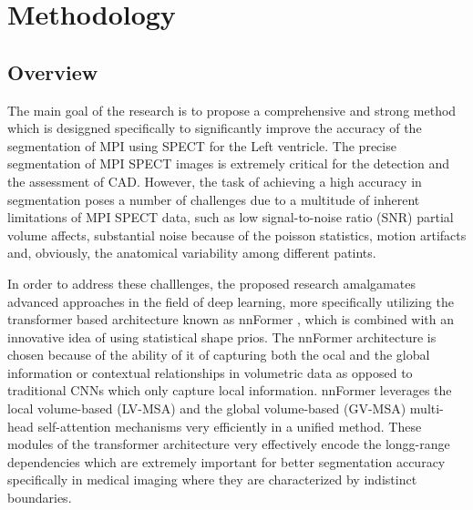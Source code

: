 \chapter{Methodology}
\label{ch:method}

% 		

\section{Overview}
The main goal of the research is to propose a comprehensive and strong method which is desiggned specifically to significantly improve the accuracy of the segmentation of MPI using SPECT for the Left ventricle. The precise segmentation of MPI SPECT images is extremely critical for the detection and the assessment of CAD. However, the task of achieving a high accuracy in segmentation poses a number of challenges due to a multitude of inherent limitations of MPI SPECT data, such as low signal-to-noise ratio (SNR) partial volume affects, substantial noise because of the poisson statistics, motion artifacts and, obviously, the anatomical variability among different patints. 

In order to address these challlenges, the proposed research amalgamates advanced approaches in the field of deep learning, more specifically utilizing the transformer based architecture known as nnFormer \cite{10.1109/TIP.2023.3293771}, which is combined with an innovative idea of using statistical shape prios. The nnFormer architecture is chosen because of the ability of it of capturing both the ocal and the global information or contextual relationships in volumetric data as opposed to traditional CNNs which only capture local information. nnFormer leverages the local volume-based (LV-MSA) and the global volume-based (GV-MSA) multi-head self-attention mechanisms very efficiently in a unified method. These modules of the transformer architecture very effectively encode the longg-range dependencies which are extremely important for better segmentation accuracy specifically in medical imaging where they are characterized by indistinct boundaries.


